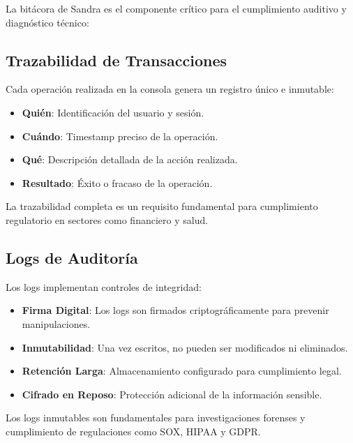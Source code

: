 La bitácora de Sandra es el componente crítico para el cumplimiento auditivo y diagnóstico técnico:

\subsection{Trazabilidad de Transacciones}

Cada operación realizada en la consola genera un registro único e inmutable:

\begin{itemize}
\item \textbf{Quién}: Identificación del usuario y sesión.
\item \textbf{Cuándo}: Timestamp preciso de la operación.
\item \textbf{Qué}: Descripción detallada de la acción realizada.
\item \textbf{Resultado}: Éxito o fracaso de la operación.
\end{itemize}

La trazabilidad completa es un requisito fundamental para cumplimiento regulatorio en sectores como financiero y salud.

\subsection{Logs de Auditoría}

Los logs implementan controles de integridad:

\begin{itemize}
\item \textbf{Firma Digital}: Los logs son firmados criptográficamente para prevenir manipulaciones.
\item \textbf{Inmutabilidad}: Una vez escritos, no pueden ser modificados ni eliminados.
\item \textbf{Retención Larga}: Almacenamiento configurado para cumplimiento legal.
\item \textbf{Cifrado en Reposo}: Protección adicional de la información sensible.
\end{itemize}

Los logs inmutables son fundamentales para investigaciones forenses y cumplimiento de regulaciones como SOX, HIPAA y GDPR.

\clearpage

